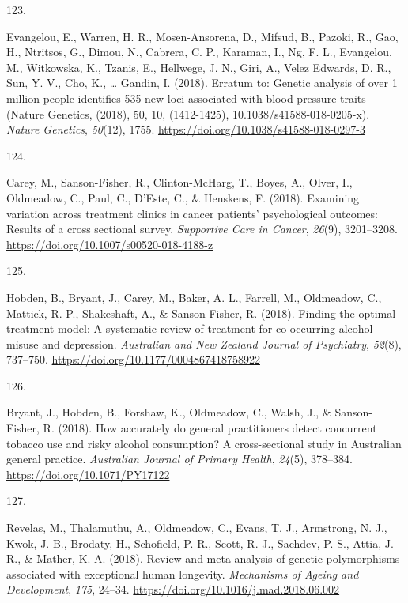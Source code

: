 \documentclass[11pt, a4paper]{awesome-cv}
\newlength{\csllabelwidth}
\newcommand{\CSLLeftMargin}[1]{\parbox[t]{\csllabelwidth}{#1}}
\newcommand{\CSLRightInline}[1]{\parbox[t]{\linewidth - \csllabelwidth}{#1}}
\begin{document}
\leavevmode\hypertarget{ref-evangelou_erratum_2018}{}%
\CSLLeftMargin{123. }
\CSLRightInline{Evangelou, E., Warren, H. R., Mosen-Ansorena, D.,
Mifsud, B., Pazoki, R., Gao, H., Ntritsos, G., Dimou, N., Cabrera, C.
P., Karaman, I., Ng, F. L., Evangelou, M., Witkowska, K., Tzanis, E.,
Hellwege, J. N., Giri, A., Velez Edwards, D. R., Sun, Y. V., Cho, K.,
\ldots{} Gandin, I. (2018). Erratum to: Genetic analysis of over 1
million people identifies 535 new loci associated with blood pressure
traits (Nature Genetics, (2018), 50, 10, (1412-1425),
10.1038/s41588-018-0205-x). \emph{Nature Genetics}, \emph{50}(12), 1755.
\url{https://doi.org/10.1038/s41588-018-0297-3}}

\leavevmode\hypertarget{ref-carey_examining_2018}{}%
\CSLLeftMargin{124. }
\CSLRightInline{Carey, M., Sanson-Fisher, R., Clinton-McHarg, T., Boyes,
A., Olver, I., Oldmeadow, C., Paul, C., D'Este, C., \& Henskens, F.
(2018). Examining variation across treatment clinics in cancer patients'
psychological outcomes: Results of a cross sectional survey.
\emph{Supportive Care in Cancer}, \emph{26}(9), 3201--3208.
\url{https://doi.org/10.1007/s00520-018-4188-z}}

\leavevmode\hypertarget{ref-hobden_finding_2018}{}%
\CSLLeftMargin{125. }
\CSLRightInline{Hobden, B., Bryant, J., Carey, M., Baker, A. L.,
Farrell, M., Oldmeadow, C., Mattick, R. P., Shakeshaft, A., \&
Sanson-Fisher, R. (2018). Finding the optimal treatment model: A
systematic review of treatment for co-occurring alcohol misuse and
depression. \emph{Australian and New Zealand Journal of Psychiatry},
\emph{52}(8), 737--750. \url{https://doi.org/10.1177/0004867418758922}}

\leavevmode\hypertarget{ref-bryant_how_2018}{}%
\CSLLeftMargin{126. }
\CSLRightInline{Bryant, J., Hobden, B., Forshaw, K., Oldmeadow, C.,
Walsh, J., \& Sanson-Fisher, R. (2018). How accurately do general
practitioners detect concurrent tobacco use and risky alcohol
consumption? A cross-sectional study in Australian general practice.
\emph{Australian Journal of Primary Health}, \emph{24}(5), 378--384.
\url{https://doi.org/10.1071/PY17122}}

\leavevmode\hypertarget{ref-revelas_review_2018}{}%
\CSLLeftMargin{127. }
\CSLRightInline{Revelas, M., Thalamuthu, A., Oldmeadow, C., Evans, T.
J., Armstrong, N. J., Kwok, J. B., Brodaty, H., Schofield, P. R., Scott,
R. J., Sachdev, P. S., Attia, J. R., \& Mather, K. A. (2018). Review and
meta-analysis of genetic polymorphisms associated with exceptional human
longevity. \emph{Mechanisms of Ageing and Development}, \emph{175},
24--34. \url{https://doi.org/10.1016/j.mad.2018.06.002}}
\end{document}
